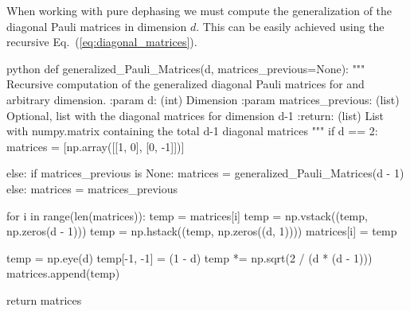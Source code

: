 When working with pure dephasing we must compute the generalization of the diagonal Pauli matrices in dimension $d$. This can be easily achieved using the recursive Eq.~(\ref{eq:diagonal_matrices}).
\begin{mintedbox}{python}
def generalized_Pauli_Matrices(d, matrices_previous=None):
	"""
	Recursive computation of the generalized diagonal Pauli matrices for and arbitrary dimension.
	:param d: (int) Dimension
	:param matrices_previous: (list) Optional, list with the diagonal matrices for dimension d-1
	:return: (list) List with numpy.matrix containing the total d-1 diagonal matrices
	"""
	if d == 2:
		matrices = [np.array([[1, 0], [0, -1]])]
	
	else:
		if matrices_previous is None:
			matrices = generalized_Pauli_Matrices(d - 1)
		else:
			matrices = matrices_previous
	
	for i in range(len(matrices)):
		temp = matrices[i]
		temp = np.vstack((temp, np.zeros(d - 1)))
		temp = np.hstack((temp, np.zeros((d, 1))))
		matrices[i] = temp
			
	temp = np.eye(d)
	temp[-1, -1] = (1 - d)
	temp *= np.sqrt(2 / (d * (d - 1)))
	matrices.append(temp)
	
	return matrices
	
\end{mintedbox}


